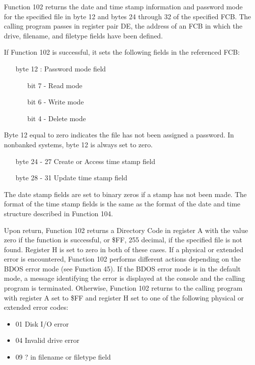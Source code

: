 Function 102 returns the date and time stamp information and password
mode for the specified file in byte 12 and bytes 24 through 32 of the
specified FCB. The calling program passes in register pair DE, the
address of an FCB in which the drive, filename, and filetype fields
have been defined.

If Function 102 is successful, it sets the following fields in the
referenced FCB:

\begin{itemize}
\item[] byte 12 : Password mode field
\begin{itemize}
\item[bit] 7 - Read mode
\item[bit] 6 - Write mode
\item[bit] 4 - Delete mode
\end{itemize}
\end{itemize}

Byte 12 equal to zero indicates the file has not been assigned a
password. In nonbanked systems, byte 12 is always set to zero.

\begin{itemize}
\item[] byte 24 - 27 Create or Access time stamp field
\item[] byte 28 - 31 Update time stamp field
\end{itemize}

The date stamp fields are set to binary zeros if a stamp has not been
made. The format of the time stamp fields is the same as the format of
the date and time structure described in Function 104.

Upon return, Function 102 returns a Directory Code in register A with
the value zero if the function is successful, or \$FF, 255 decimal, if
the specified file is not found. Register H is set to zero in both of
these cases. If a physical or extended error is encountered, Function
102 performs different actions depending on the BDOS error mode (see
Function 45). If the BDOS error mode is in the default mode, a message
identifying the error is displayed at the console and the calling
program is terminated. Otherwise, Function 102 returns to the calling
program with register A set to \$FF and register H set to one of the
following physical or extended error codes:

\begin{itemize}
\item 01 Disk I/O error
\item 04 Invalid drive error
\item 09 ? in filename or filetype field
\end{itemize}

